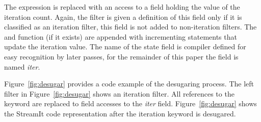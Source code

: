 The \iter expression is replaced with an access to a field holding the
value of the iteration count.  Again, the filter is given a definition
of this field only if it is classified as an iteration filter, this
field is not added to non-iteration filters.  The \work and \prework
function (if it exists) are appended with incrementing statements that
update the iteration value.  The name of the state field is compiler
defined for easy recognition by later passes, for the remainder of
this paper the field is named {\it iter}.


Figure~\ref{fig:desugar} provides a code example of the desugaring
process.  The left filter in Figure~\ref{fig:desugar} shows an
iteration filter.  All references to the keyword are replaced to field
accesses to the {\it iter} field.  Figure~\ref{fig:desugar} shows the
StreamIt code representation after the iteration keyword is desugared.


